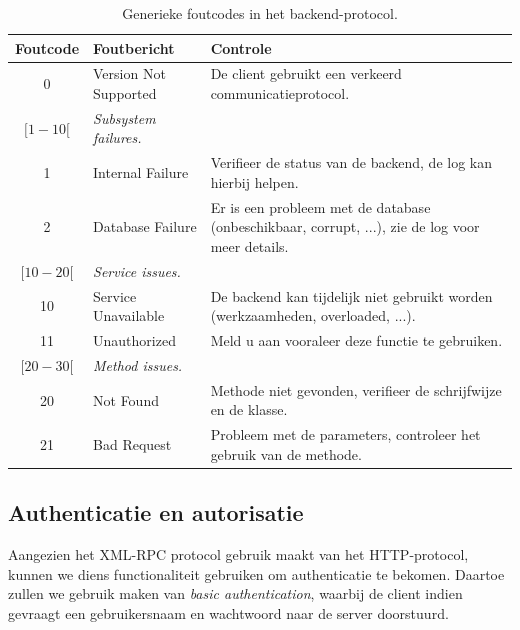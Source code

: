 \begin{table}
\begin{tabular}{| c p{5cm} p{7cm} |}
	\hline
	Foutcode & Foutbericht & Controle \\
	\hline
	
	0 & Version Not Supported & De client gebruikt een verkeerd communicatieprotocol. \\
	\hline
	
	$[1-10[$ & \emph{Subsystem failures.} & \\
	1 & Internal Failure & Verifieer de status van de backend, de log kan hierbij helpen. \\
	2 & Database Failure & Er is een probleem met de database (onbeschikbaar, corrupt, ...), zie de log voor meer details. \\
	\hline
	
	$[10-20[$ & \emph{Service issues.} & \\
	10 & Service Unavailable & De backend kan tijdelijk niet gebruikt worden (werkzaamheden, overloaded, ...). \\
	11 & Unauthorized & Meld u aan vooraleer deze functie te gebruiken. \\
	\hline
	
	$[20-30[$ & \emph{Method issues.} & \\
	20 & Not Found & Methode niet gevonden, verifieer de schrijfwijze en de klasse. \\
	21 & Bad Request & Probleem met de parameters, controleer het gebruik van de methode. \\
	\hline
\end{tabular}
\caption{Generieke foutcodes in het backend-protocol.}
\end{table}

\subsection{Authenticatie en autorisatie}

Aangezien het XML-RPC protocol gebruik maakt van het HTTP-protocol, kunnen we diens functionaliteit gebruiken om authenticatie te bekomen. Daartoe zullen we gebruik maken van \emph{basic authentication}, waarbij de client indien gevraagt een gebruikersnaam en wachtwoord naar de server doorstuurd.

